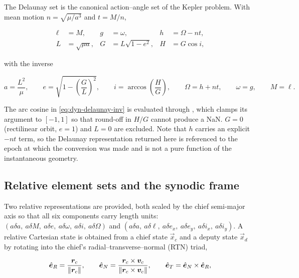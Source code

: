 The Delaunay set is the canonical action--angle set of the Kepler problem. With
mean motion $n=\sqrt{\mu/a^3}$ and $t=M/n$,

\begin{align}
  \ell &= M, & g &= \omega, & h &= \Omega - n t, \label{eq:dyn-delaunay-angles}\\
  L &= \sqrt{\mu a}, & G &= L\sqrt{1-e^2}, & H &= G\cos i, \label{eq:dyn-delaunay-actions}
\end{align}

with the inverse

\begin{equation}
  \label{eq:dyn-delaunay-inv}
  a = \frac{L^2}{\mu}, \qquad
  e = \sqrt{1-\left(\frac{G}{L}\right)^{2}}, \qquad
  i = \arccos\!\left(\frac{H}{G}\right), \qquad
  \Omega = h + n t, \qquad \omega = g, \qquad M = \ell .
\end{equation}

The arc cosine in \cref{eq:dyn-delaunay-inv} is evaluated through
, which clamps its argument to $[-1,1]$ so that round-off in
$H/G$ cannot produce a NaN. $G=0$ (rectilinear orbit, $e=1$) and $L=0$ are
excluded. Note that $h$ carries an explicit $-nt$ term, so the Delaunay
representation returned here is referenced to the epoch at which the conversion
was made and is not a pure function of the instantaneous geometry.

\subsection{Relative element sets and the synodic frame}
\label{sec:dyn-relative}

Two relative representations are provided, both scaled by the chief semi-major
axis so that all six components carry length units: 
$(a\delta a,\ a\delta M,\ a\delta e,\ a\delta\omega,\ a\delta i,\
a\delta\Omega)$ and  $(a\delta a,\ a\delta\ell,\
a\delta e_x,\ a\delta e_y,\ a\delta i_x,\ a\delta i_y)$. A relative Cartesian
state \cpp{RelCart6} is obtained from a chief state $\vec{x}_c$ and a deputy
state $\vec{x}_d$ by rotating into the chief's radial--transverse--normal (RTN)
triad,

\begin{equation}
  \label{eq:dyn-rtn-basis}
  \hat{\bm{e}}_R = \frac{\bm{r}_c}{\lVert\bm{r}_c\rVert}, \qquad
  \hat{\bm{e}}_N = \frac{\bm{r}_c\times\bm{v}_c}{\lVert\bm{r}_c\times\bm{v}_c\rVert}, \qquad
  \hat{\bm{e}}_T = \hat{\bm{e}}_N\times\hat{\bm{e}}_R,
\end{equation}

